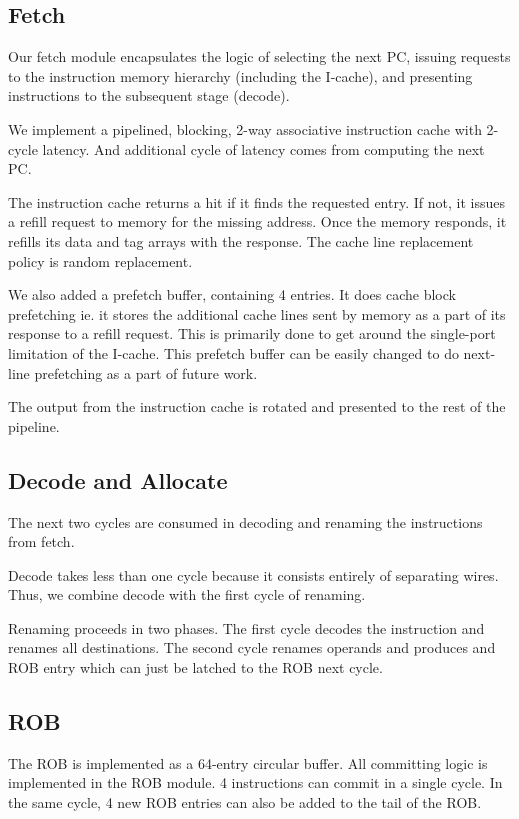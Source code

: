 \documentclass{article}
\begin{document}
\subsection{Fetch}

Our fetch module encapsulates the logic of selecting the next PC, issuing
requests to the instruction memory hierarchy (including the I-cache), and presenting
instructions to the subsequent stage (decode).

We implement a pipelined, blocking, 2-way associative instruction cache with
2-cycle latency. And additional cycle of latency comes from computing the next
PC.

The instruction cache returns a hit if it finds the requested entry. If not, it
issues a refill request to memory for the missing address. Once the memory
responds, it refills its data and tag arrays with the response. The cache line
replacement policy is random replacement.  

We also added a prefetch buffer, containing 4 entries. It does cache block
prefetching ie. it stores the additional cache lines sent by memory as a part
of its response to a refill request. This is primarily done to get around the
single-port limitation of the I-cache. This prefetch buffer can be easily
changed to do next-line prefetching as a part of future work.

The output from the instruction cache is rotated and presented to the rest of
the pipeline.

\subsection{Decode and Allocate}

The next two cycles are consumed in decoding and renaming the instructions from
fetch.

Decode takes less than one cycle because it consists entirely of separating
wires. Thus, we combine decode with the first cycle of renaming.

Renaming proceeds in two phases. The first cycle decodes the instruction and
renames all destinations. The second cycle renames operands and produces and ROB
entry which can just be latched to the ROB next cycle.

\subsection{ROB}

The ROB is implemented as a 64-entry circular buffer. All committing logic is
implemented in the ROB module. 4 instructions can commit in a single cycle. In
the same cycle, 4 new ROB entries can also be added to the tail of the ROB.
\end{document}
